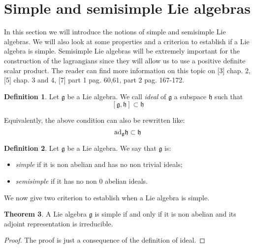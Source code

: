\documentclass[12pt,a4paper]{report}
\theoremstyle{definition}
\newtheorem{Def}{Definition}[chapter]
\theoremstyle{Theorem}
\newtheorem{Theo}[Def]{Theorem}
\theoremstyle{definition}
\theoremstyle{definition}
\begin{document}
	\section{Simple and semisimple Lie algebras}
	In this section we will introduce the notions of simple and semisimple Lie algebras. We will also look at some properties and a criterion to establish if a Lie algebra is simple. Semisimple Lie algebras will be extremely important for the construction of the lagrangians since they will allow us to use a positive definite scalar product. The reader can find more information on this topic on [3] chap. 2, [5] chap. 3 and 4, [7] part 1 pag. 60,61, part 2 pag. 167-172.
	\begin{Def}
		Let $\mathfrak{g}$ be a Lie algebra. We call \textit{ideal} of $\mathfrak{g}$ a subspace $\mathfrak{h}$ such that 
		$$[\mathfrak{g},\mathfrak{h}]\subset\mathfrak{h}$$
	\end{Def}
	Equivalently, the above condition can also be rewritten like:
	$$\hbox{ad}_\mathfrak{g}\mathfrak{h}\subset\mathfrak{h}$$
	\begin{Def}
		Let $\mathfrak{g}$ be a Lie algebra. We say that $\mathfrak{g}$ is:
		\begin{itemize}
			\item \textit{simple} if it is non abelian and has no non trivial ideals;
			\item \textit{semisimple} if it has no non 0 abelian ideals.
		\end{itemize}
	\end{Def}
	We now give two criterion to establish when a Lie algebra is simple.
	\begin{Theo}
		A Lie algebra $\mathfrak{g}$ is simple if and only if it is non abelian and its adjoint representation is irreducible.
	\end{Theo}
	\begin{proof}
		The proof is just a consequence of the definition of ideal.			
	\end{proof}
\end{document}
